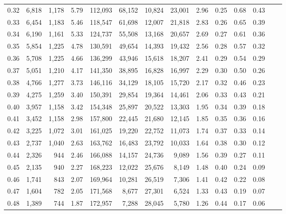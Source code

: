 \begin{tabular}{rrrrrrrrrrrrrr}
0.32 &  6,818 &  1,178 &    5.79 &  112,093 &   68,152 &  10,824 &  23,001 &  2.96 &  0.25 &  0.68 &      0.43 \\
0.33 &  6,454 &  1,183 &    5.46 &  118,547 &   61,698 &  12,007 &  21,818 &  2.83 &  0.26 &  0.65 &      0.39 \\
0.34 &  6,190 &  1,161 &    5.33 &  124,737 &   55,508 &  13,168 &  20,657 &  2.69 &  0.27 &  0.61 &      0.36 \\
0.35 &  5,854 &  1,225 &    4.78 &  130,591 &   49,654 &  14,393 &  19,432 &  2.56 &  0.28 &  0.57 &      0.32 \\
0.36 &  5,708 &  1,225 &    4.66 &  136,299 &   43,946 &  15,618 &  18,207 &  2.41 &  0.29 &  0.54 &      0.29 \\
0.37 &  5,051 &  1,210 &    4.17 &  141,350 &   38,895 &  16,828 &  16,997 &  2.29 &  0.30 &  0.50 &      0.26 \\
0.38 &  4,766 &  1,277 &    3.73 &  146,116 &   34,129 &  18,105 &  15,720 &  2.17 &  0.32 &  0.46 &      0.23 \\
0.39 &  4,275 &  1,259 &    3.40 &  150,391 &   29,854 &  19,364 &  14,461 &  2.06 &  0.33 &  0.43 &      0.21 \\
0.40 &  3,957 &  1,158 &    3.42 &  154,348 &   25,897 &  20,522 &  13,303 &  1.95 &  0.34 &  0.39 &      0.18 \\
0.41 &  3,452 &  1,158 &    2.98 &  157,800 &   22,445 &  21,680 &  12,145 &  1.85 &  0.35 &  0.36 &      0.16 \\
0.42 &  3,225 &  1,072 &    3.01 &  161,025 &   19,220 &  22,752 &  11,073 &  1.74 &  0.37 &  0.33 &      0.14 \\
0.43 &  2,737 &  1,040 &    2.63 &  163,762 &   16,483 &  23,792 &  10,033 &  1.64 &  0.38 &  0.30 &      0.12 \\
0.44 &  2,326 &    944 &    2.46 &  166,088 &   14,157 &  24,736 &   9,089 &  1.56 &  0.39 &  0.27 &      0.11 \\
0.45 &  2,135 &    940 &    2.27 &  168,223 &   12,022 &  25,676 &   8,149 &  1.48 &  0.40 &  0.24 &      0.09 \\
0.46 &  1,741 &    843 &    2.07 &  169,964 &   10,281 &  26,519 &   7,306 &  1.41 &  0.42 &  0.22 &      0.08 \\
0.47 &  1,604 &    782 &    2.05 &  171,568 &    8,677 &  27,301 &   6,524 &  1.33 &  0.43 &  0.19 &      0.07 \\
0.48 &  1,389 &    744 &    1.87 &  172,957 &    7,288 &  28,045 &   5,780 &  1.26 &  0.44 &  0.17 &      0.06 \\

\end{tabular}
